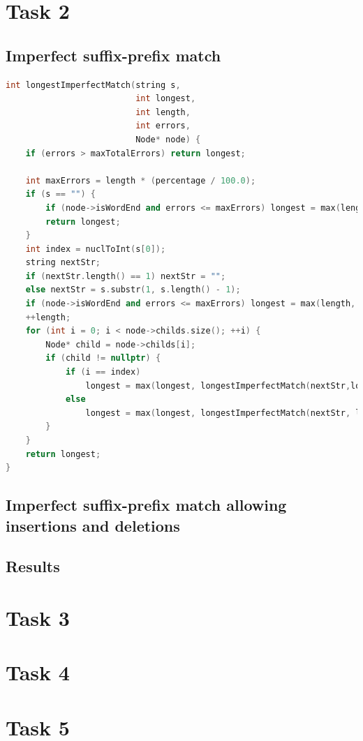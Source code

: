 \documentclass[a4paper,10pt]{article}
\begin{document}
\newpage

\section{Task 2}

\subsection{Imperfect suffix-prefix match}

\begin{lstlisting}[language=c++, caption=Recursive algorithm for imperfect suffix-prefix match]
int longestImperfectMatch(string s,
                          int longest,
                          int length,
                          int errors,
                          Node* node) {
    if (errors > maxTotalErrors) return longest;

    int maxErrors = length * (percentage / 100.0);
    if (s == "") {
        if (node->isWordEnd and errors <= maxErrors) longest = max(length, longest);
        return longest;
    }
    int index = nuclToInt(s[0]);
    string nextStr;
    if (nextStr.length() == 1) nextStr = "";
    else nextStr = s.substr(1, s.length() - 1);
    if (node->isWordEnd and errors <= maxErrors) longest = max(length, longest);
    ++length;
    for (int i = 0; i < node->childs.size(); ++i) {
        Node* child = node->childs[i];
        if (child != nullptr) {
            if (i == index) 
                longest = max(longest, longestImperfectMatch(nextStr,longest, length, errors, child));
            else 
                longest = max(longest, longestImperfectMatch(nextStr, longest, length, errors  + 1, child));
        }
    }
    return longest;
}
\end{lstlisting}

\subsection{Imperfect suffix-prefix match allowing insertions and deletions}

\subsection{Results}

\newpage

\section{Task 3}

\newpage

\section{Task 4}

\newpage

\section{Task 5}
\end{document}
